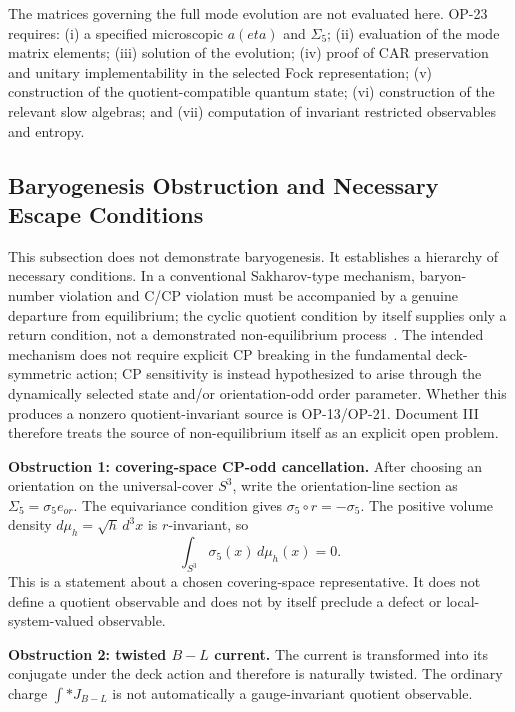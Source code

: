 \documentclass[11pt]{article}
\theoremstyle{canonmath}
\theoremstyle{canonpostulate}
\theoremstyle{canonclaim}
\def\mathrm#1{#1}%
\def\eta{eta}%
\begin{document}
\begin{keyresult}
The matrices governing the full mode evolution are not evaluated here. OP-23 requires: (i) a specified microscopic $a(\eta)$ and $\Sigma_5$; (ii) evaluation of the mode matrix elements; (iii) solution of the evolution; (iv) proof of CAR preservation and unitary implementability in the selected Fock representation; (v) construction of the quotient-compatible quantum state; (vi) construction of the relevant slow algebras; and (vii) computation of invariant restricted observables and entropy.
\end{keyresult}

\subsection{Baryogenesis Obstruction and Necessary Escape Conditions}

This subsection does not demonstrate baryogenesis. It establishes a hierarchy of necessary conditions. In a conventional Sakharov-type mechanism, baryon-number violation and C/CP violation must be accompanied by a genuine departure from equilibrium; the cyclic quotient condition by itself supplies only a return condition, not a demonstrated non-equilibrium process~\cite{Sakharov1967}. The intended mechanism does not require explicit CP breaking in the fundamental deck-symmetric action; CP sensitivity is instead hypothesized to arise through the dynamically selected state and/or orientation-odd order parameter. Whether this produces a nonzero quotient-invariant source is OP-13/OP-21. Document III therefore treats the source of non-equilibrium itself as an explicit open problem.

\textbf{Obstruction 1: covering-space CP-odd cancellation.} After choosing an orientation on the universal-cover $S^3$, write the orientation-line section as $\Sigma_5=\sigma_5 e_{\mathrm{or}}$. The equivariance condition gives $\sigma_5\circ r=-\sigma_5$. The positive volume density $d\mu_h=\sqrt h\,d^3x$ is $r$-invariant, so
\begin{equation}
\int_{S^3}\sigma_5(x)\,d\mu_h(x)=0.
\end{equation}
This is a statement about a chosen covering-space representative. It does not define a quotient observable and does not by itself preclude a defect or local-system-valued observable.

\textbf{Obstruction 2: twisted $B-L$ current.} The current is transformed into its conjugate under the deck action and therefore is naturally twisted. The ordinary charge $\int *J_{B-L}$ is not automatically a gauge-invariant quotient observable.
\end{document}

